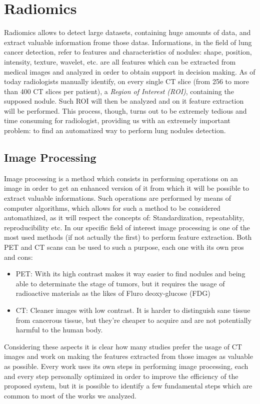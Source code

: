 \documentclass[../main.tex]{subfiles}
\begin{document}
\section{Radiomics}
Radiomics allows to detect large datasets, containing huge amounts of data, and extract valuable information frome those datas. Informations, in the field of lung cancer detection, refer to features and characteristics of nodules: shape, position, intensity, texture, wavelet, etc. are all features which can be extracted from medical images and analyzed in order to obtain support in decision making. \cite{Chen2017} As of today radiologists manually identify, on every single CT slice (from 256 to more than 400 CT slices per patient), a \textit{Region of Interest (ROI)}, containing the supposed nodule. Such ROI will then be analyzed and on it feature extraction will be performed. This process, though, turns out to be extremely tedious and time consuming for radiologist, providing us with an extremely important problem: to find an automatized way to perform lung nodules detection. 
\vspace{5mm}
\subsection{Image Processing}
Image processing is a method which consists in performing operations on an image in order to get an enhanced version of it from which it will be possible to extract valuable informations. Such operations are performed by means of computer algorithms, which allows for such a method to be considered automathized, as it will respect the concepts of: Standardization, repeatablity, reproducibility etc.
In our specific field of interest image processing is one of the most used methods (if not actually the first) to perform feature extraction. Both PET and CT scans can be used to such a purpose, each one with its own pros and cons:
\begin{itemize}
	\item PET: With its high contrast makes it way easier to find nodules and being able to determinate the stage of tumors, but it requires the usage of radioactive materials as the likes of Fluro deoxy-glucose (FDG)
	\item CT: Cleaner images with low contrast. It is harder to distinguish sane tissue from cancerous tissue, but they're cheaper to acquire and are not potentially harmful to the human body.
\end{itemize}

Considering these aspects it is clear how many studies prefer the usage of CT images and work on making the features extracted from those images as valuable as possible. 
Every work uses its own steps in performing image processing, each and every step personally optimized in order to improve the efficiency of the proposed system, but it is possible to identify a few fundamental steps which are common to most of the works we analyzed. \cite{Khan2015,Chaudhary2012, LogeshKumar2016, Amutha2013, Mu, Punithavathy2015}
\end{document}
